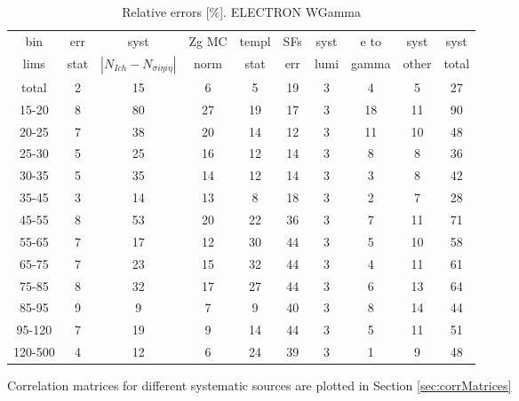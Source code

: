 \begin{table}[h]
  \scriptsize
  \begin{center}
  \caption{Relative errors [\%]. ELECTRON WGamma}
   \begin{tabular}{|c|c|c|c|c|c|c|c|c|c|}
    bin  & err & syst & Zg MC & templ & SFs & syst & e to & syst & syst\\
    lims  & stat & $|N_{Ich}-N_{\sigma{i\eta i\eta}}|$ & norm & stat & err & lumi & gamma & other & total\\ \hline
    total  & 2 & 15 & 6 & 5 & 19 & 3 & 4 & 5 & 27 \\ \hline
    15-20 & 8 & 80 & 27 & 19 & 17 & 3 & 18 & 11 & 90 \\ \hline
    20-25 & 7 & 38 & 20 & 14 & 12 & 3 & 11 & 10 & 48 \\ \hline
    25-30 & 5 & 25 & 16 & 12 & 14 & 3 & 8 & 8 & 36 \\ \hline
    30-35 & 5 & 35 & 14 & 12 & 14 & 3 & 3 & 8 & 42 \\ \hline
    35-45 & 3 & 14 & 13 & 8 & 18 & 3 & 2 & 7 & 28 \\ \hline
    45-55 & 8 & 53 & 20 & 22 & 36 & 3 & 7 & 11 & 71 \\ \hline
    55-65 & 7 & 17 & 12 & 30 & 44 & 3 & 5 & 10 & 58 \\ \hline
    65-75 & 7 & 23 & 15 & 32 & 44 & 3 & 4 & 11 & 61 \\ \hline
    75-85 & 8 & 32 & 17 & 27 & 44 & 3 & 6 & 13 & 64 \\ \hline
    85-95 & 9 & 9 & 7 & 9 & 40 & 3 & 8 & 14 & 44 \\ \hline
    95-120 & 7 & 19 & 9 & 14 & 44 & 3 & 5 & 11 & 51 \\ \hline
    120-500 & 4 & 12 & 6 & 24 & 39 & 3 & 1 & 9 & 48 \\ \hline
  \end{tabular}
  \label{tab:systInPercent_ELECTRON_WGamma}
  \end{center}
\end{table}


Correlation matrices for different systematic sources are plotted in Section \ref{sec:corrMatrices}


